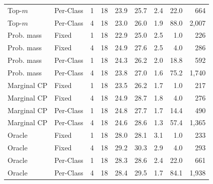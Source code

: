 \begin{tabular}{llrrrrrrr}
Top-$m$ & Per-Class & 1 & 18 & 23.9 & 25.7 & 2.4 & 22.0 & 664 \\
Top-$m$ & Per-Class & 4 & 18 & 23.0 & 26.0 & 1.9 & 88.0 & 2,007 \\
Prob. mass & Fixed & 1 & 18 & 22.9 & 25.0 & 2.5 & 1.0 & 226 \\
Prob. mass & Fixed & 4 & 18 & 24.9 & 27.6 & 2.5 & 4.0 & 286 \\
Prob. mass & Per-Class & 1 & 18 & 24.3 & 26.2 & 2.0 & 18.8 & 592 \\
Prob. mass & Per-Class & 4 & 18 & 23.8 & 27.0 & 1.6 & 75.2 & 1,740 \\
Marginal CP & Fixed & 1 & 18 & 23.5 & 26.2 & 1.7 & 1.0 & 217 \\
Marginal CP & Fixed & 4 & 18 & 24.9 & 28.7 & 1.8 & 4.0 & 276 \\
Marginal CP & Per-Class & 1 & 18 & 24.8 & 27.7 & 1.7 & 14.4 & 490 \\
Marginal CP & Per-Class & 4 & 18 & 24.6 & 28.6 & 1.3 & 57.4 & 1,365 \\
Oracle & Fixed & 1 & 18 & 28.0 & 28.1 & 3.1 & 1.0 & 233 \\
Oracle & Fixed & 4 & 18 & 29.2 & 30.3 & 2.9 & 4.0 & 293 \\
Oracle & Per-Class & 1 & 18 & 28.3 & 28.6 & 2.4 & 22.0 & 661 \\
Oracle & Per-Class & 4 & 18 & 28.4 & 29.5 & 1.7 & 84.1 & 1,938 \\
\bottomrule
\end{tabular}
